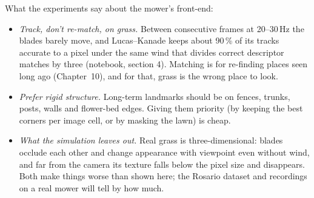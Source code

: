 \begin{mower}
What the experiments say about the mower's front-end:
\begin{itemize}[nosep]
\item \emph{Track, don't re-match, on grass.} Between consecutive frames
  at 20--30\,Hz the blades barely move, and Lucas--Kanade keeps about
  90\,\% of its tracks accurate to a pixel under the same wind that
  divides correct descriptor matches by three (notebook, section 4).
  Matching is for re-finding places seen long ago (Chapter~10), and for
  that, grass is the wrong place to look.
\item \emph{Prefer rigid structure.} Long-term landmarks should be on
  fences, trunks, posts, walls and flower-bed edges. Giving them priority
  (by keeping the best corners per image cell, or by masking the lawn)
  is cheap.
\item \emph{What the simulation leaves out.} Real grass is
  three-dimensional: blades occlude each other and change appearance with
  viewpoint even without wind, and far from the camera its texture falls
  below the pixel size and disappears. Both make things worse than shown
  here; the Rosario dataset and recordings on a real mower will tell by
  how much.
\end{itemize}
\end{mower}

